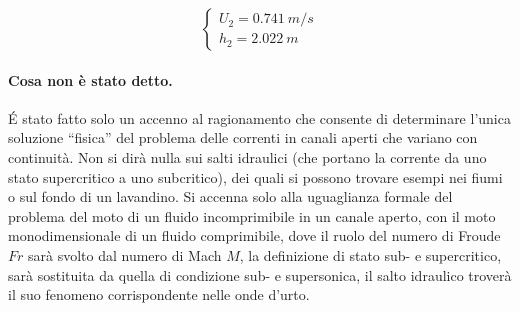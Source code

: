 \begin{equation}
  \begin{cases}
   U_2 = 0.741 \ m/s \\
   h_2 = 2.022 \ m
  \end{cases}
\end{equation}

\vspace{0.5cm}
\paragraph{Cosa non è stato detto.} \'E stato fatto solo un accenno al 
 ragionamento che consente di determinare l'unica soluzione ``fisica'' del
 problema delle correnti in canali aperti che variano con continuità.
 Non si dirà nulla sui salti idraulici (che portano la corrente da uno
 stato supercritico a uno subcritico), dei quali si possono trovare 
 esempi nei fiumi o sul fondo di un lavandino.
Si accenna solo alla uguaglianza formale del problema del moto
 di un fluido incomprimibile in un canale aperto, con il moto
 monodimensionale di un 
 fluido comprimibile, dove il ruolo del numero di Froude $\textit{Fr}$
 sarà svolto dal numero di Mach $M$, la definizione di stato sub- e
 supercritico, sarà sostituita da quella di condizione sub- e supersonica,
 il salto idraulico troverà il suo fenomeno corrispondente nelle onde d'urto.
